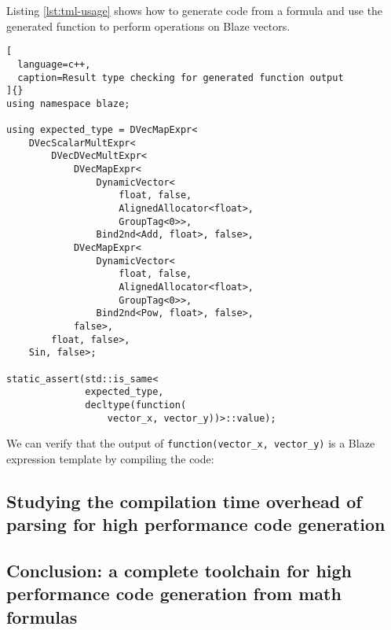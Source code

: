 \documentclass[../main]{subfiles}
\begin{document}
Listing \ref{lst:tml-usage} shows how to generate code from a formula
and use the generated function to perform operations on Blaze vectors.

\begin{lstlisting}[
  language=c++,
  caption=Result type checking for generated function output
]{}
using namespace blaze;

using expected_type = DVecMapExpr<
    DVecScalarMultExpr<
        DVecDVecMultExpr<
            DVecMapExpr<
                DynamicVector<
                    float, false,
                    AlignedAllocator<float>,
                    GroupTag<0>>,
                Bind2nd<Add, float>, false>,
            DVecMapExpr<
                DynamicVector<
                    float, false,
                    AlignedAllocator<float>,
                    GroupTag<0>>,
                Bind2nd<Pow, float>, false>,
            false>,
        float, false>,
    Sin, false>;

static_assert(std::is_same<
              expected_type,
              decltype(function(
                  vector_x, vector_y))>::value);
\end{lstlisting}

We can verify that the output of \lstinline{function(vector_x, vector_y)}
is a Blaze expression template by compiling the code:

\subsection{
  Studying the compilation time overhead of parsing
  for high performance code generation
}

\subsection{
  Conclusion: a complete toolchain for high performance code generation
  from math formulas
}
\end{document}
